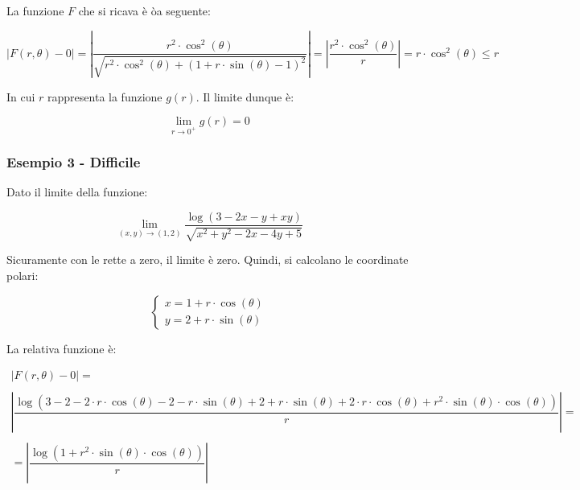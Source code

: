 \documentclass[a4paper]{article}
\begin{document}
	\noindent
	La funzione $F$ che si ricava è òa seguente:
	
	\begin{equation*}
		\left|F\left(r,\theta\right) - 0\right| = \left|\dfrac{r^{2} \cdot \cos^{2}\left(\theta\right)}{\sqrt{r^{2} \cdot \cos^{2}\left(\theta\right) + \left(1 + r \cdot \sin\left(\theta\right) - 1\right)^{2}}}\right| = \left|\dfrac{r^{2} \cdot \cos^{2}\left(\theta\right)}{r}\right| = r \cdot \cos^{2}\left(\theta\right) \le r
	\end{equation*}

	\noindent
	In cui $r$ rappresenta la funzione $g\left(r\right)$. Il limite dunque è:
	
	\begin{equation*}
		\lim_{r \rightarrow 0^{+}} g\left(r\right) = 0
	\end{equation*}

	\newpage
	
	\subsubsection[Esempio 3 - Difficile]{\textcolor{Green4}{Esempio 3 - Difficile}}
	
	Dato il limite della funzione:
	
	\begin{equation*}
		\lim_{\left(x,y\right) \rightarrow \left(1,2\right)} \dfrac{\log\left(3 - 2x -y + xy\right)}{\sqrt{x^{2} + y^{2} - 2x -4y + 5}}
	\end{equation*}

	\noindent
	Sicuramente con le rette a zero, il limite è zero. Quindi, si calcolano le coordinate polari:
	
	\begin{equation*}
		\begin{cases}
			x = 1 + r \cdot \cos\left(\theta\right) \\
			y = 2 + r \cdot \sin\left(\theta\right)
		\end{cases}
	\end{equation*}

	\noindent
	La relativa funzione è:
	
	\begin{gather*}
		\left|F\left(r,\theta\right) - 0\right| = \\
		\\
		\left|\dfrac{\log\left(3 - 2 - 2 \cdot r \cdot \cos\left(\theta\right) - 2 - r \cdot \sin\left(\theta\right) + 2 + r \cdot \sin\left(\theta\right) + 2 \cdot r \cdot \cos\left(\theta\right) + r^{2} \cdot \sin\left(\theta\right) \cdot \cos\left(\theta\right)\right)}{r}\right| = \\
		\\
		= \left|\dfrac{\log\left(1 + r^{2} \cdot \sin\left(\theta\right) \cdot \cos\left(\theta\right)\right)}{r}\right|
	\end{gather*}
\end{document}
